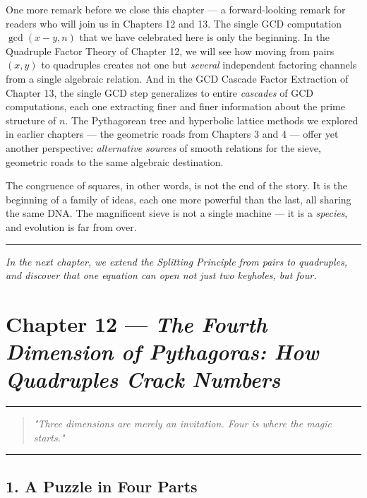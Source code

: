 \documentclass[12pt, letterpaper, openany]{book}
\theoremstyle{definition}
\theoremstyle{remark}
\begin{document}
One more remark before we close this chapter --- a forward-looking remark for readers who will join us in Chapters 12 and 13. The single GCD computation $\gcd(x - y, n)$ that we have celebrated here is only the beginning. In the Quadruple Factor Theory of Chapter 12, we will see how moving from pairs $(x, y)$ to quadruples creates not one but \textit{several} independent factoring channels from a single algebraic relation. And in the GCD Cascade Factor Extraction of Chapter 13, the single GCD step generalizes to entire \textit{cascades} of GCD computations, each one extracting finer and finer information about the prime structure of $n$. The Pythagorean tree and hyperbolic lattice methods we explored in earlier chapters --- the geometric roads from Chapters 3 and 4 --- offer yet another perspective: \textit{alternative sources} of smooth relations for the sieve, geometric roads to the same algebraic destination.

The congruence of squares, in other words, is not the end of the story. It is the beginning of a family of ideas, each one more powerful than the last, all sharing the same DNA. The magnificent sieve is not a single machine --- it is a \textit{species}, and evolution is far from over.


\bigskip\noindent\rule{\textwidth}{0.4pt}\bigskip


\textit{In the next chapter, we extend the Splitting Principle from pairs to quadruples, and discover that one equation can open not just two keyholes, but four.}


\clearpage

\chapter{Chapter 12 --- \textit{The Fourth Dimension of Pythagoras: How Quadruples Crack Numbers}}



\bigskip\noindent\rule{\textwidth}{0.4pt}\bigskip



\begin{quote}
\textit{"Three dimensions are merely an invitation. Four is where the magic starts."}
\end{quote}



\bigskip\noindent\rule{\textwidth}{0.4pt}\bigskip



\section*{1. A Puzzle in Four Parts}
\end{document}
